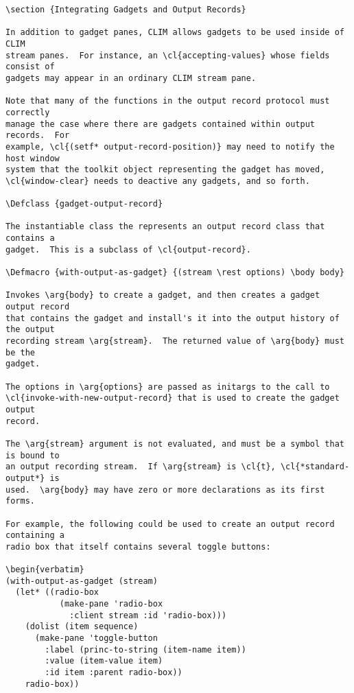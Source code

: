 \begin{verbatim}
\section {Integrating Gadgets and Output Records}

In addition to gadget panes, CLIM allows gadgets to be used inside of CLIM
stream panes.  For instance, an \cl{accepting-values} whose fields consist of
gadgets may appear in an ordinary CLIM stream pane.

Note that many of the functions in the output record protocol must correctly
manage the case where there are gadgets contained within output records.  For
example, \cl{(setf* output-record-position)} may need to notify the host window
system that the toolkit object representing the gadget has moved,
\cl{window-clear} needs to deactive any gadgets, and so forth.

\Defclass {gadget-output-record}

The instantiable class the represents an output record class that contains a
gadget.  This is a subclass of \cl{output-record}.

\Defmacro {with-output-as-gadget} {(stream \rest options) \body body} 

Invokes \arg{body} to create a gadget, and then creates a gadget output record
that contains the gadget and install's it into the output history of the output
recording stream \arg{stream}.  The returned value of \arg{body} must be the
gadget.

The options in \arg{options} are passed as initargs to the call to
\cl{invoke-with-new-output-record} that is used to create the gadget output
record.

The \arg{stream} argument is not evaluated, and must be a symbol that is bound to
an output recording stream.  If \arg{stream} is \cl{t}, \cl{*standard-output*} is
used.  \arg{body} may have zero or more declarations as its first forms.

For example, the following could be used to create an output record containing a
radio box that itself contains several toggle buttons:

\begin{verbatim}
(with-output-as-gadget (stream)
  (let* ((radio-box
           (make-pane 'radio-box 
             :client stream :id 'radio-box)))
    (dolist (item sequence)
      (make-pane 'toggle-button 
        :label (princ-to-string (item-name item))
        :value (item-value item)
        :id item :parent radio-box))
    radio-box))
\end{verbatim}

